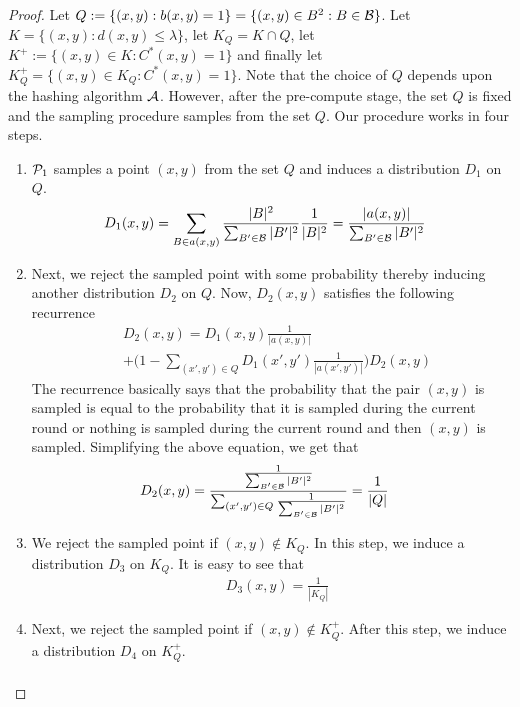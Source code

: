 \posDistribution*
\begin{proof}
Let $Q := \{(x, y): b(x, y) = 1\} = \{(x, y) \in B^2: B \in \mathcal B\}$. Let $K = \{(x, y): d(x, y) \le \lambda\}$, let $K_Q = K\cap Q$, let $K^+ := \{(x, y) \in K: C^*(x, y) = 1\}$ and finally let $K_Q^+ = \{(x, y) \in K_Q : C^*(x, y) = 1\}$. Note that the choice of $Q$ depends upon the hashing algorithm $\mathcal A$. However, after the pre-compute stage, the set $Q$ is fixed and the sampling procedure samples from the set $Q$. Our procedure works in four steps. 
\begin{enumerate}[noitemsep,label=\textbf{S.\arabic*}]
  \item $\mathcal P_1$ samples a point $(x, y)$ from the set $Q$ and induces a distribution $D_1$ on $Q$. 
  \begin{align*}
    &D_1(x, y) = \sum_{B \in a(x, y)} \frac{|B|^2}{\sum_{B' \in \mathcal B}|B'|^2}\frac{1}{|B|^2} = \frac{|a(x, y)|}{\sum_{B' \in \mathcal B}|B'|^2}
  \end{align*}
  \item Next, we reject the sampled point with some probability thereby inducing another distribution $D_2$ on $Q$. Now, $D_2(x, y)$ satisfies the following recurrence
  \begin{align*}
    &D_2(x, y) = D_1(x, y) \frac{1}{|a(x, y)|} \\
    &+ \Big(1-\sum_{(x', y') \in Q} D_1(x', y') \frac{1}{|a(x', y')|}\Big)D_2(x, y)
  \end{align*}
  The recurrence basically says that the probability that the pair $(x, y)$ is sampled is equal to the probability that it is sampled during the current round or nothing is sampled during the current round and then $(x, y)$ is sampled. Simplifying the above equation, we get that
   \begin{align*}
    &D_2(x, y) = \frac{\frac{1}{\sum_{B' \in \mathcal B}|B'|^2}}{\sum_{(x', y') \in Q}\frac{1}{\sum_{B' \in \mathcal B}|B'|^2}} = \frac{1}{|Q|}
  \end{align*}
  \item We reject the sampled point if $(x, y) \not\in K_Q$. In this step, we induce a distribution $D_3$ on $K_Q$. It is easy to see that
  \begin{align*}
    &D_3(x, y) = \frac{1}{|K_Q|}
  \end{align*}
  \item \label{item:D4} Next, we reject the sampled point if $(x, y) \not\in K_Q^+$. After this step, we induce a distribution $D_4$ on $K^+_Q$.
  \begin{align*}

\end{align*}
\end{enumerate}
\end{proof}

